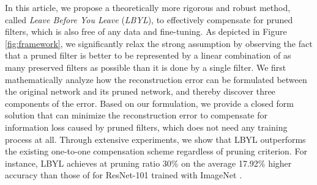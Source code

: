 In this article, we propose a theoretically more rigorous and robust method, called \textit{Leave Before You Leave} (\textit{LBYL}), to effectively compensate for pruned filters, which is also free of any data and fine-tuning. As depicted in Figure \ref{fig:framework}, we significantly relax the strong assumption by observing the fact that a pruned filter is better to be represented by a linear combination of as many preserved filters as possible than it is done by a single filter. We first mathematically analyze how the reconstruction error can be formulated between the original network and its pruned network, and thereby discover three components of the error. Based on our formulation, we provide a closed form solution that can minimize the reconstruction error to compensate for information loss caused by pruned filters, which does not need any training process at all. Through extensive experiments, we show that LBYL outperforms the existing one-to-one compensation scheme \cite{NM} regardless of pruning criterion. For instance, LBYL achieves at pruning ratio 30\% on the average 17.92\% higher accuracy than those of \cite{NM} for ResNet-101 \cite{ResNet} trained with ImageNet \cite{deng2009imagenet}.












